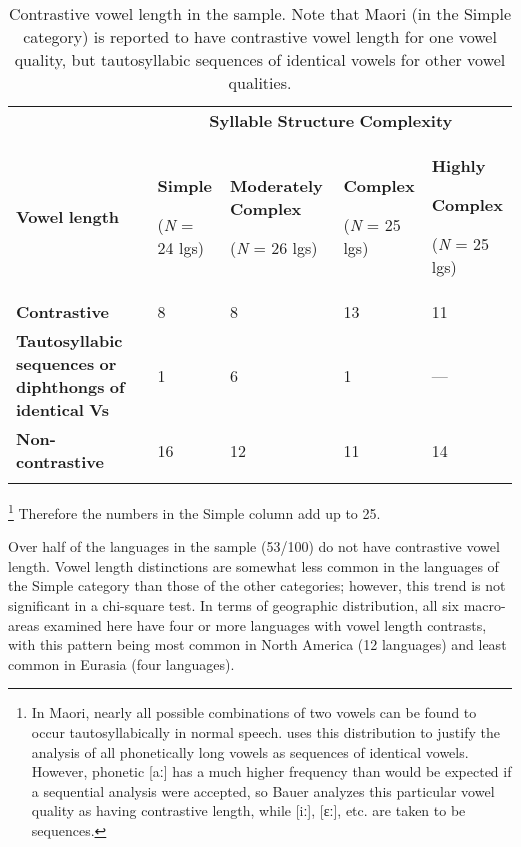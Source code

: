 \begin{table}
\begin{tabularx}{\textwidth}{XXXXX}
 & \multicolumn{4}{c}{ \textbf{Syllable} \textbf{Structure} \textbf{Complexity}}\\
\lsptoprule
\textbf{Vowel} \textbf{length} & { \textbf{Simple}}

 (\textit{N} = 24 lgs) & { \textbf{Moderately} \textbf{Complex}}

 (\textit{N} = 26 lgs) & { \textbf{Complex}}

 (\textit{N} = 25 lgs) & { \textbf{Highly} }

{ \textbf{Complex}}

 (\textit{N} = 25 lgs)\\
\textbf{Contrastive} & 8 & 8 & 13 & 11\\
\textbf{Tautosyllabic} \textbf{sequences} \textbf{or} \textbf{diphthongs} \textbf{of} \textbf{identical} \textbf{Vs} & 1 & 6 & 1 & —\\
\textbf{Non-contrastive} & 16 & 12 & 11 & 14\\
\lspbottomrule
\end{tabularx}
\caption{\label{4.3}Contrastive vowel length in the sample. Note that Maori (in the Simple category) is reported to have contrastive vowel length for one vowel quality, but tautosyllabic sequences of identical vowels for other vowel qualities.}
\footnote{ \textrm{In Maori, nearly all possible combinations of two vowels can be found to occur tautosyllabically in normal speech. \citet[524-8]{Bauer1999} uses this distribution to justify the analysis of all phonetically long vowels as sequences of identical vowels. However, phonetic [aː] has a much higher frequency than would be expected if a sequential analysis were accepted, so Bauer analyzes this particular vowel quality as having contrastive length, while [iː], [ɛː], etc. are taken to be sequences.}}
Therefore the numbers in the Simple column add up to 25.
\end{table}

  Over half of the languages in the sample (53/100) do not have contrastive vowel length. Vowel length distinctions are somewhat less common in the languages of the Simple category than those of the other categories; however, this trend is not significant in a chi-square test. In terms of geographic distribution, all six macro-areas examined here have four or more languages with vowel length contrasts, with this pattern being most common in North America (12 languages) and least common in Eurasia (four languages).

